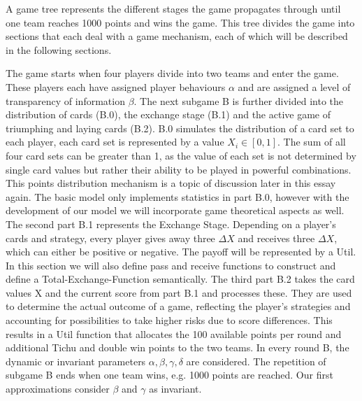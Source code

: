 A game tree represents the different stages the game propagates through until one team reaches 1000 points and wins the game. This tree divides the game into sections that each deal with a game mechanism, each of which will be described in the following sections.

The game starts when four players divide into two teams and enter the game. These players each have assigned player behaviours $\alpha$ and are assigned a level of transparency of information $\beta$. The next subgame B is further divided into the distribution of cards (B.0), the exchange stage (B.1) and the active game of triumphing and laying cards (B.2). B.0 simulates the distribution of a card set to each player, each card set is represented by a value $X_i \in [0,1]$. The sum of all four card sets can be greater than 1, as the value of each set is not determined by single card values but rather their ability to be played in powerful combinations. This points distribution mechanism is a topic of discussion later in this essay again. The basic model only implements statistics in part B.0, however with the development of our model we will incorporate game theoretical aspects as well. The second part B.1 represents the Exchange Stage. Depending on a player’s cards and strategy, every player gives away three $\Delta X$ and receives three $\Delta X$, which can either be positive or negative. The payoff will be represented by a Util. In this section we will also define pass and receive functions to construct and define a Total-Exchange-Function semantically. The third part B.2 takes the card values X and the current score from part B.1 and processes these. They are used to determine the actual outcome of a game, reflecting the player’s strategies and accounting for possibilities to take higher risks due to score differences. This results in a Util  function that allocates the 100 available points per round and additional Tichu and double win points to the two teams.
In every round B, the dynamic or invariant parameters $\alpha, \beta, \gamma, \delta$ are considered. The repetition of subgame B ends when one team wins, e.g. 1000 points are reached. Our first approximations consider $\beta$ and $\gamma$ as invariant.


